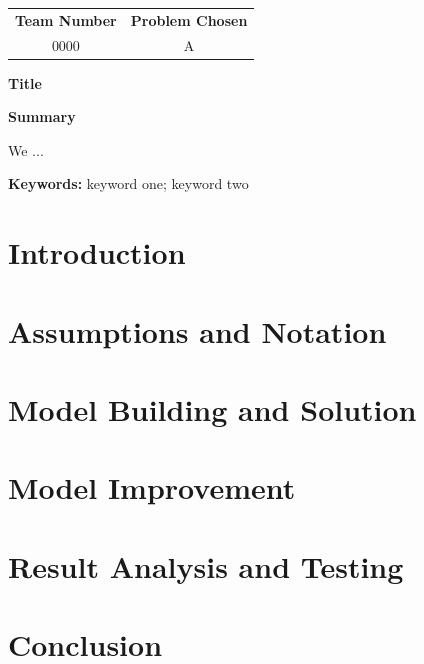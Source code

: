 \documentclass[12pt,a4paper]{article}
\newif\ifwithtoc \withtoctrue   %
\newcommand{\TeamNumber}{0000}
\newcommand{\ProblemChosen}{A}
\newcommand{\PaperTitle}{Title}
\begin{document}
\begin{center}
\begin{tabular}{|c|c|}
\hline
\textbf{Team Number} & \textbf{Problem Chosen}\\
\TeamNumber & \ProblemChosen\\
\hline
\end{tabular}

\medskip
{\Large\bfseries \PaperTitle}\par\smallskip
{\large\bfseries Summary}
\end{center}
We ...

\medskip
\noindent\textbf{Keywords:} keyword one; keyword two
\clearpage

\ifwithtoc
\tableofcontents
\clearpage
\fi

\section{Introduction}
\section{Assumptions and Notation}
\section{Model Building and Solution}
\section{Model Improvement}
\section{Result Analysis and Testing}
\section{Conclusion}

% 
% 

\appendix
\end{document}
